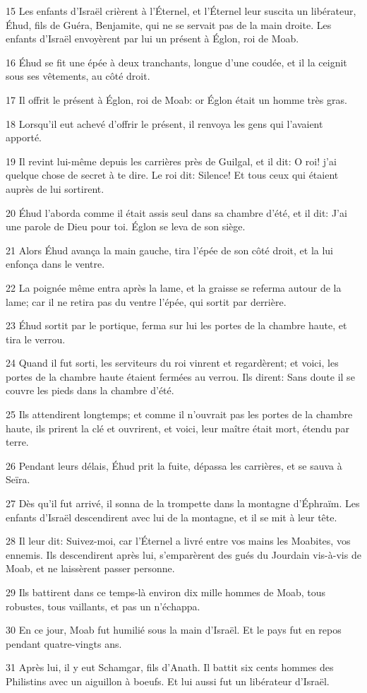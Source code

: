 \par 15 Les enfants d'Israël crièrent à l'Éternel, et l'Éternel leur suscita un libérateur, Éhud, fils de Guéra, Benjamite, qui ne se servait pas de la main droite. Les enfants d'Israël envoyèrent par lui un présent à Églon, roi de Moab.
\par 16 Éhud se fit une épée à deux tranchants, longue d'une coudée, et il la ceignit sous ses vêtements, au côté droit.
\par 17 Il offrit le présent à Églon, roi de Moab: or Églon était un homme très gras.
\par 18 Lorsqu'il eut achevé d'offrir le présent, il renvoya les gens qui l'avaient apporté.
\par 19 Il revint lui-même depuis les carrières près de Guilgal, et il dit: O roi! j'ai quelque chose de secret à te dire. Le roi dit: Silence! Et tous ceux qui étaient auprès de lui sortirent.
\par 20 Éhud l'aborda comme il était assis seul dans sa chambre d'été, et il dit: J'ai une parole de Dieu pour toi. Églon se leva de son siège.
\par 21 Alors Éhud avança la main gauche, tira l'épée de son côté droit, et la lui enfonça dans le ventre.
\par 22 La poignée même entra après la lame, et la graisse se referma autour de la lame; car il ne retira pas du ventre l'épée, qui sortit par derrière.
\par 23 Éhud sortit par le portique, ferma sur lui les portes de la chambre haute, et tira le verrou.
\par 24 Quand il fut sorti, les serviteurs du roi vinrent et regardèrent; et voici, les portes de la chambre haute étaient fermées au verrou. Ils dirent: Sans doute il se couvre les pieds dans la chambre d'été.
\par 25 Ils attendirent longtemps; et comme il n'ouvrait pas les portes de la chambre haute, ils prirent la clé et ouvrirent, et voici, leur maître était mort, étendu par terre.
\par 26 Pendant leurs délais, Éhud prit la fuite, dépassa les carrières, et se sauva à Seïra.
\par 27 Dès qu'il fut arrivé, il sonna de la trompette dans la montagne d'Éphraïm. Les enfants d'Israël descendirent avec lui de la montagne, et il se mit à leur tête.
\par 28 Il leur dit: Suivez-moi, car l'Éternel a livré entre vos mains les Moabites, vos ennemis. Ils descendirent après lui, s'emparèrent des gués du Jourdain vis-à-vis de Moab, et ne laissèrent passer personne.
\par 29 Ils battirent dans ce temps-là environ dix mille hommes de Moab, tous robustes, tous vaillants, et pas un n'échappa.
\par 30 En ce jour, Moab fut humilié sous la main d'Israël. Et le pays fut en repos pendant quatre-vingts ans.
\par 31 Après lui, il y eut Schamgar, fils d'Anath. Il battit six cents hommes des Philistins avec un aiguillon à boeufs. Et lui aussi fut un libérateur d'Israël.

